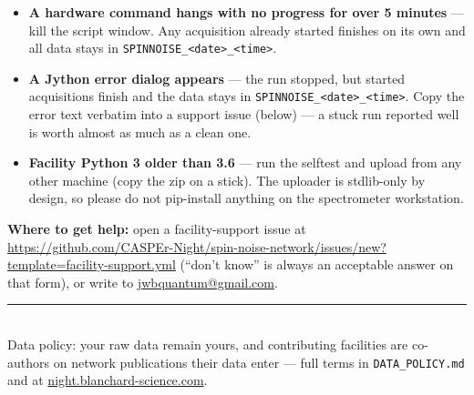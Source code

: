 \documentclass[11pt]{article}
\newcommand{\file}[1]{\texttt{#1}}
\begin{document}
\begin{itemize}
\item \textbf{A hardware command hangs with no progress for over 5 minutes}
      --- kill the script window. Any acquisition already started finishes on
      its own and all data stays in \file{SPINNOISE\_<date>\_<time>}.
\item \textbf{A Jython error dialog appears} --- the run stopped, but started
      acquisitions finish and the data stays in \file{SPINNOISE\_<date>\_<time>}.
      Copy the error text verbatim into a support issue (below) --- a stuck
      run reported well is worth almost as much as a clean one.
\item \textbf{Facility Python 3 older than 3.6} --- run the selftest and
      upload from any other machine (copy the zip on a stick). The uploader
      is stdlib-only by design, so please do not pip-install anything on
      the spectrometer workstation.
\end{itemize}

\textbf{Where to get help:} open a facility-support issue at
\url{https://github.com/CASPEr-Night/spin-noise-network/issues/new?template=facility-support.yml}
(``don't know'' is always an acceptable answer on that form), or write to
\href{mailto:jwbquantum@gmail.com}{jwbquantum@gmail.com}.

\vspace{1.5em}
\noindent\rule{\textwidth}{0.4pt}\\[2pt]
{\small Data policy: your raw data remain yours, and contributing facilities
are co-authors on network publications their data enter --- full terms in
\file{DATA\_POLICY.md} and at
\href{https://night.blanchard-science.com}{night.blanchard-science.com}.}
\end{document}
